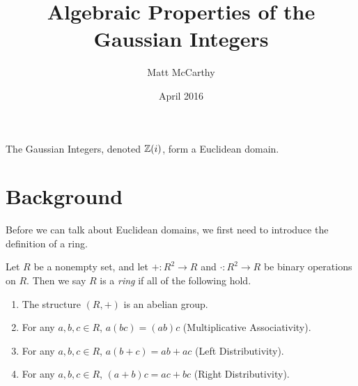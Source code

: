 \documentclass[notitlepage]{simple}
\title{Algebraic Properties of the Gaussian Integers}
\author{Matt McCarthy}
\date{April 2016}
\begin{document}
\maketitle

\begin{thm*}
	The Gaussian Integers, denoted $\mathbb{Z}(i)$, form a Euclidean domain.
\end{thm*}

\section{Background}

Before we can talk about Euclidean domains, we first need to introduce the definition of a ring.

\begin{definition}[Ring]
	Let $R$ be a nonempty set, and let $+:R^2\rightarrow R$ and $\cdot:R^2\rightarrow R$ be binary operations on $R$.
	Then we say $R$ is a \textit{ring} if all of the following hold.
	\begin{enumerate}
		\item The structure $(R,+)$ is an abelian group.
		\item For any $a,b,c\in R$, $a(bc)=(ab)c$ (Multiplicative Associativity).
		\item For any $a,b,c\in R$, $a(b+c)=ab+ac$ (Left Distributivity).
		\item For any $a,b,c\in R$, $(a+b)c=ac+bc$ (Right Distributivity).
	\end{enumerate}
\end{definition}
\end{document}
